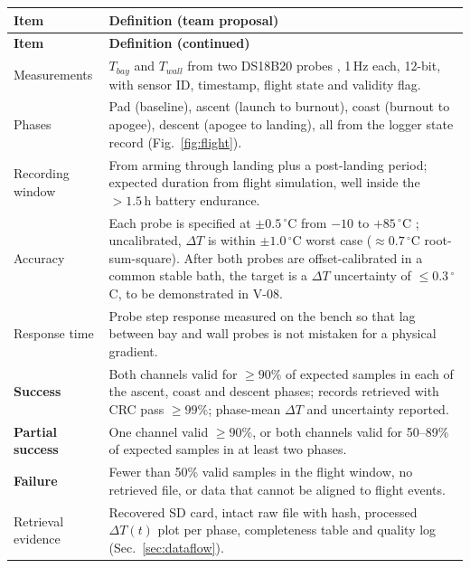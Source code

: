 \small
{}
\begin{longtable}{@{}L{36mm}L{110mm}@{}}
\toprule{}\textbf{Item}&\textbf{Definition (team proposal)}\\\midrule\endfirsthead
\toprule{}\textbf{Item}&\textbf{Definition (continued)}\\\midrule\endhead
\bottomrule\endlastfoot
Measurements & $T_{bay}$ and $T_{wall}$ from two DS18B20 probes \cite{ds18b20ds}, 1\,Hz each, 12-bit, with sensor ID, timestamp, flight state and validity flag.\\
Phases & Pad (baseline), ascent (launch to burnout), coast (burnout to apogee), descent (apogee to landing), all from the logger state record (Fig.~\ref{fig:flight}).\\
Recording window & From arming through landing plus a post-landing period; expected duration from flight simulation, well inside the $>1.5$\,h battery endurance.\\
Accuracy & Each probe is specified at $\pm0.5\,^{\circ}$C from $-10$ to $+85\,^{\circ}$C \cite{ds18b20ds}; uncalibrated, $\Delta T$ is within $\pm1.0\,^{\circ}$C worst case ($\approx0.7\,^{\circ}$C root-sum-square). After both probes are offset-calibrated in a common stable bath, the target is a $\Delta T$ uncertainty of $\le0.3\,^{\circ}$C, to be demonstrated in V-08.\\
Response time & Probe step response measured on the bench so that lag between bay and wall probes is not mistaken for a physical gradient.\\
\textbf{Success} & Both channels valid for $\ge90\%$ of expected samples in each of the ascent, coast and descent phases; records retrieved with CRC pass $\ge99\%$; phase-mean $\Delta T$ and uncertainty reported.\\
\textbf{Partial success} & One channel valid $\ge90\%$, or both channels valid for 50--89\% of expected samples in at least two phases.\\
\textbf{Failure} & Fewer than 50\% valid samples in the flight window, no retrieved file, or data that cannot be aligned to flight events.\\
Retrieval evidence & Recovered SD card, intact raw file with hash, processed $\Delta T(t)$ plot per phase, completeness table and quality log (Sec.~\ref{sec:dataflow}).\\
\end{longtable}
\normalsize

